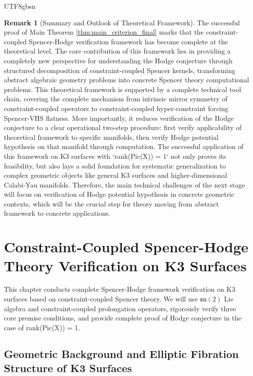 \documentclass[a4paper,12pt]{extarticle}
\theoremstyle{definition}
\newtheorem{remark}{Remark}[section]
\begin{document}
\begin{CJK}{UTF8}{gbsn}
\begin{remark}[Summary and Outlook of Theoretical Framework]
\label{rem:framework_summary_outlook}
The successful proof of Main Theorem \ref{thm:main_criterion_final} marks that the constraint-coupled Spencer-Hodge verification framework has become complete at the theoretical level. The core contribution of this framework lies in providing a completely new perspective for understanding the Hodge conjecture through structured decomposition of constraint-coupled Spencer kernels, transforming abstract algebraic geometry problems into concrete Spencer theory computational problems. This theoretical framework is supported by a complete technical tool chain, covering the complete mechanism from intrinsic mirror symmetry of constraint-coupled operators to constraint-coupled hyper-constraint forcing Spencer-VHS flatness. More importantly, it reduces verification of the Hodge conjecture to a clear operational two-step procedure: first verify applicability of theoretical framework to specific manifolds, then verify Hodge potential hypothesis on that manifold through computation. The successful application of this framework on K3 surfaces with `rank(Pic(X)) = 1` not only proves its feasibility, but also lays a solid foundation for systematic generalization to complex geometric objects like general K3 surfaces and higher-dimensional Calabi-Yau manifolds. Therefore, the main technical challenges of the next stage will focus on verification of Hodge potential hypothesis in concrete geometric contexts, which will be the crucial step for theory moving from abstract framework to concrete applications.
\end{remark}

\section{Constraint-Coupled Spencer-Hodge Theory Verification on K3 Surfaces}
\label{sec:k3_constraint_coupled_verification}

This chapter conducts complete Spencer-Hodge framework verification on K3 surfaces based on constraint-coupled Spencer theory. We will use $\mathfrak{su}(2)$ Lie algebra and constraint-coupled prolongation operators, rigorously verify three core premise conditions, and provide complete proof of Hodge conjecture in the case of rank(Pic(X)) = 1.

\subsection{Geometric Background and Elliptic Fibration Structure of K3 Surfaces}
\label{subsec:k3_geometric_background}


\end{CJK}
\end{document}
